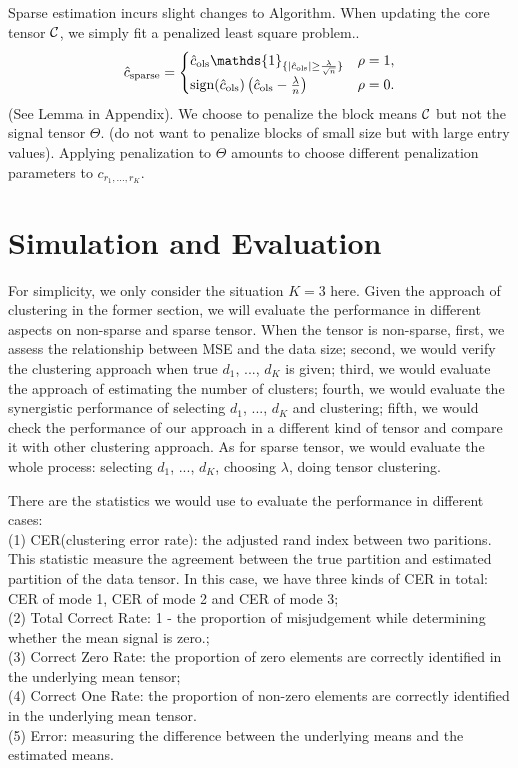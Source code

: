 \documentclass{article}
\begin{document}
Sparse estimation incurs slight changes to Algorithm. When updating the core tensor $\mathcal{C}$, we simply fit a penalized least square problem..
\[
\hat c_{\text{sparse}}=
\begin{cases}
\hat c_{\text{ols}}\mathds{1}_{\{|\hat c_{\text{ols}} |\geq {\lambda \over \sqrt{n}}\}}& \rho=1,\\
\text{sign}(\hat c_{\text{ols}})\left( \hat c_{\text{ols}}-{\lambda \over n}  \right) &\rho=0.
\end{cases}
\]
(See Lemma in Appendix). 
We choose to penalize the block means $\mathcal{C}$ but not the signal tensor $\Theta$. (do not want to penalize blocks of small size but with large entry values). Applying penalization to $\Theta$ amounts to choose different penalization parameters to $c_{r_1,\ldots,r_K}$.  



\section{Simulation and Evaluation}
For simplicity, we only consider the situation $K=3$ here. 
Given the approach of clustering in the former section, we will evaluate the performance  in different aspects on non-sparse and sparse tensor. When the tensor is non-sparse, first, we assess the relationship between MSE and the data size; second, we would verify the clustering approach when true $d_1$, ..., $d_K$ is given; third, we would evaluate the approach of estimating the number of clusters; fourth, we would evaluate the synergistic performance of selecting $d_1$, ..., $d_K$ and clustering; fifth, we would check the performance of our approach in a different kind of tensor and compare it with other clustering approach. As for sparse tensor, we would evaluate the whole process: selecting $d_1$, ..., $d_K$, choosing $\lambda$, doing tensor clustering.\par 

There are the statistics we would use to evaluate the performance in different cases:\\
(1) CER(clustering error rate): the adjusted rand index between two paritions. This statistic measure the agreement between the true partition and estimated partition of the data tensor. In this case, we have three kinds of CER in total: CER of mode 1, CER of mode 2 and CER of mode 3;\\
(2) Total Correct Rate: 1 - the proportion of misjudgement while determining whether the mean signal is zero.;\\
(3) Correct Zero Rate: the proportion of zero elements are correctly identified in the underlying mean tensor;\\
(4) Correct One Rate: the proportion of non-zero elements are correctly identified in the underlying mean tensor.\\
(5) Error: measuring the difference between the underlying means and the estimated means.\par  
\end{document}
